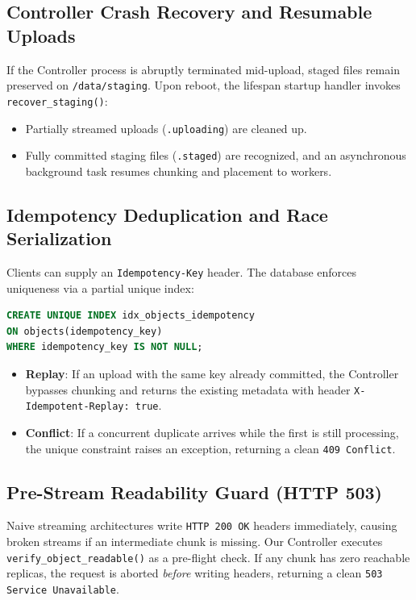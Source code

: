 \documentclass[11pt,a4paper]{article}
\begin{document}
\subsection{Controller Crash Recovery and Resumable Uploads}
If the Controller process is abruptly terminated mid-upload, staged files remain preserved on \texttt{/data/staging}. Upon reboot, the lifespan startup handler invokes \texttt{recover\_staging()}:
\begin{itemize}[noitemsep]
    \item Partially streamed uploads (\texttt{.uploading}) are cleaned up.
    \item Fully committed staging files (\texttt{.staged}) are recognized, and an asynchronous background task resumes chunking and placement to workers.
\end{itemize}

\subsection{Idempotency Deduplication and Race Serialization}
Clients can supply an \texttt{Idempotency-Key} header. The database enforces uniqueness via a partial unique index:
\begin{lstlisting}[language=SQL]
CREATE UNIQUE INDEX idx_objects_idempotency 
ON objects(idempotency_key) 
WHERE idempotency_key IS NOT NULL;
\end{lstlisting}
\begin{itemize}[noitemsep]
    \item \textbf{Replay}: If an upload with the same key already committed, the Controller bypasses chunking and returns the existing metadata with header \texttt{X-Idempotent-Replay: true}.
    \item \textbf{Conflict}: If a concurrent duplicate arrives while the first is still processing, the unique constraint raises an exception, returning a clean \texttt{409 Conflict}.
\end{itemize}

\subsection{Pre-Stream Readability Guard (HTTP 503)}
Naive streaming architectures write \texttt{HTTP 200 OK} headers immediately, causing broken streams if an intermediate chunk is missing. Our Controller executes \texttt{verify_object_readable()} as a pre-flight check. If any chunk has zero reachable replicas, the request is aborted \textit{before} writing headers, returning a clean \texttt{503 Service Unavailable}.
\end{document}
